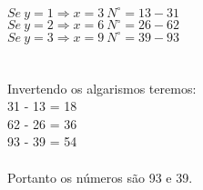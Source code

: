 \documentclass[a4paper,14pt]{article}
\begin{document}
\begin{multicols}{2}
\begin{enumerate}
        	$Se~y = 1 \Rightarrow x = 3~N^\circ = 13 - 31$ \\
        	$Se~y = 2 \Rightarrow x = 6~N^\circ = 26 - 62$ \\
        	$Se~y = 3 \Rightarrow x = 9~N^\circ = 39 - 93$ \\
            \\ \\
        Invertendo os algarismos teremos: \\
        31 - 13 = 18 \\
        62 - 26 = 36 \\
        93 - 39 = 54 \\ \\
        Portanto os números são 93 e 39.
    
    \end{enumerate}        
    \end{multicols}    
\end{document}
